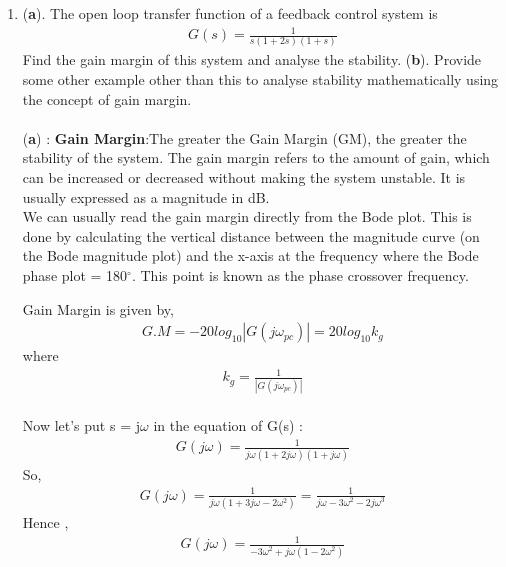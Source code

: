 \begin{enumerate}[label=\thesection.\arabic*.,ref=\thesection.\theenumi]
\item
 
(\textbf{a}). The open loop transfer function of a feedback control system is  
\begin{align}
G(s) = \frac{1}{s(1+2s)(1+s)} 
\end{align}
Find the gain margin of this system and analyse the stability.
(\textbf{b}). Provide some other example other than this to analyse stability mathematically using the concept of gain margin.
 \\



\solution
\\
(\textbf{a}) : \textbf{Gain Margin}:The greater the Gain Margin (GM), the greater the stability of the system. The gain margin refers to the amount of gain, which can be increased or decreased without making the system unstable. It is usually expressed as a magnitude in dB.
\\

We can usually read the gain margin directly from the Bode plot. This is done by calculating the vertical distance between the magnitude curve (on the Bode magnitude plot) and the x-axis at the frequency where the Bode phase plot = 180$^{\circ}$. This point is known as the phase crossover frequency.

Gain Margin is given by,
\begin{align}
G.M = -20log_{10}|G(j\omega_{pc})| = 20log_{10}k_{g}
\end{align}
where 
\begin{align}
k_{g}=\frac{1}{|G(j\omega_{pc})|} 
\end{align}
\\

Now let's put s = j$\omega$ in the equation of G(s) :
\begin{align}
G(j\omega) = \frac{1}{j\omega(1+2j\omega)(1+j\omega)} 
\end{align}
So,
\begin{align}
G(j\omega) = \frac{1}{j\omega(1+3j\omega-2\omega^2)}=\frac{1}{j\omega-3\omega^2-2j\omega^3}
\end{align}
Hence ,
\begin{align}
G(j\omega) = \frac{1}{-3\omega^2+j\omega(1-2\omega^2)} 
\end{align}


\end{enumerate}
